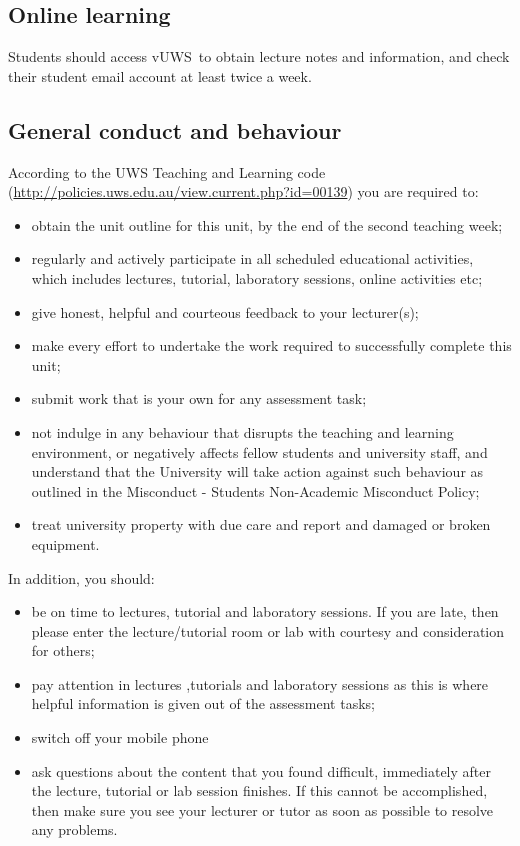 \documentclass[a4paper,oneside]{book}
\newcommand{\vuws}{vUWS}
\begin{document}
\subsection*{Online learning}
Students should access \vuws~to obtain lecture notes and information,
and check their student email account at least twice a week.

\subsection*{General conduct and behaviour}

According to the UWS Teaching and Learning code
(\url{http://policies.uws.edu.au/view.current.php?id=00139}) you are
required to:
\begin{itemize}
\item obtain the unit outline for this unit, by the end of the second
  teaching week;
\item regularly and actively participate in all scheduled educational
  activities, which includes lectures, tutorial, laboratory sessions,
  online activities etc;
\item give honest, helpful and courteous feedback to your lecturer(s);
\item make every effort to undertake the work required to successfully
  complete this unit;
\item submit work that is your own for any assessment task;
\item not indulge in any behaviour that disrupts the teaching and
  learning environment, or negatively affects fellow students and
  university staff, and understand that the University will take
  action against such behaviour as outlined in the Misconduct -
  Students Non-Academic Misconduct Policy;
\item treat university property with due care and report and damaged
  or broken equipment.
\end{itemize}
In addition, you should:
\begin{itemize}
\item be on time to lectures, tutorial and laboratory sessions.  If
  you are late, then please enter the lecture/tutorial room or lab
  with courtesy and consideration for others;
\item pay attention in lectures ,tutorials and laboratory sessions as
  this is where helpful information is given out of the assessment
  tasks;
\item switch off your mobile phone
\item ask questions about the content that you found difficult,
  immediately after the lecture, tutorial or lab session finishes.  If
  this cannot be accomplished, then make sure you see your lecturer or
  tutor as soon as possible to resolve any problems.
\end{itemize}
\end{document}
